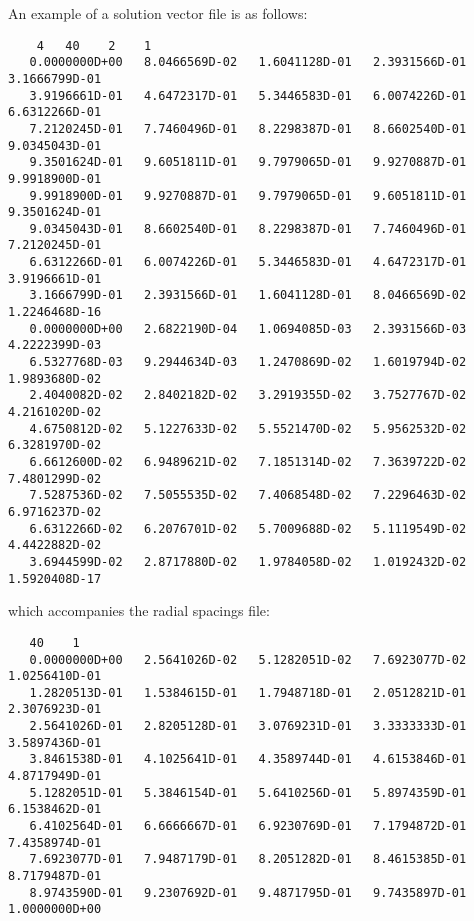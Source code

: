 An example of a solution vector file is as follows:
\begin{scriptsize}
\begin{verbatim}
    4   40    2    1
   0.0000000D+00   8.0466569D-02   1.6041128D-01   2.3931566D-01   3.1666799D-01
   3.9196661D-01   4.6472317D-01   5.3446583D-01   6.0074226D-01   6.6312266D-01
   7.2120245D-01   7.7460496D-01   8.2298387D-01   8.6602540D-01   9.0345043D-01
   9.3501624D-01   9.6051811D-01   9.7979065D-01   9.9270887D-01   9.9918900D-01
   9.9918900D-01   9.9270887D-01   9.7979065D-01   9.6051811D-01   9.3501624D-01
   9.0345043D-01   8.6602540D-01   8.2298387D-01   7.7460496D-01   7.2120245D-01
   6.6312266D-01   6.0074226D-01   5.3446583D-01   4.6472317D-01   3.9196661D-01
   3.1666799D-01   2.3931566D-01   1.6041128D-01   8.0466569D-02   1.2246468D-16
   0.0000000D+00   2.6822190D-04   1.0694085D-03   2.3931566D-03   4.2222399D-03
   6.5327768D-03   9.2944634D-03   1.2470869D-02   1.6019794D-02   1.9893680D-02
   2.4040082D-02   2.8402182D-02   3.2919355D-02   3.7527767D-02   4.2161020D-02
   4.6750812D-02   5.1227633D-02   5.5521470D-02   5.9562532D-02   6.3281970D-02
   6.6612600D-02   6.9489621D-02   7.1851314D-02   7.3639722D-02   7.4801299D-02
   7.5287536D-02   7.5055535D-02   7.4068548D-02   7.2296463D-02   6.9716237D-02
   6.6312266D-02   6.2076701D-02   5.7009688D-02   5.1119549D-02   4.4422882D-02
   3.6944599D-02   2.8717880D-02   1.9784058D-02   1.0192432D-02   1.5920408D-17
\end{verbatim}
\end{scriptsize}
which accompanies the radial spacings file:
\begin{scriptsize}
\begin{verbatim}
   40    1
   0.0000000D+00   2.5641026D-02   5.1282051D-02   7.6923077D-02   1.0256410D-01
   1.2820513D-01   1.5384615D-01   1.7948718D-01   2.0512821D-01   2.3076923D-01
   2.5641026D-01   2.8205128D-01   3.0769231D-01   3.3333333D-01   3.5897436D-01
   3.8461538D-01   4.1025641D-01   4.3589744D-01   4.6153846D-01   4.8717949D-01
   5.1282051D-01   5.3846154D-01   5.6410256D-01   5.8974359D-01   6.1538462D-01
   6.4102564D-01   6.6666667D-01   6.9230769D-01   7.1794872D-01   7.4358974D-01
   7.6923077D-01   7.9487179D-01   8.2051282D-01   8.4615385D-01   8.7179487D-01
   8.9743590D-01   9.2307692D-01   9.4871795D-01   9.7435897D-01   1.0000000D+00\end{verbatim}
\end{scriptsize}

